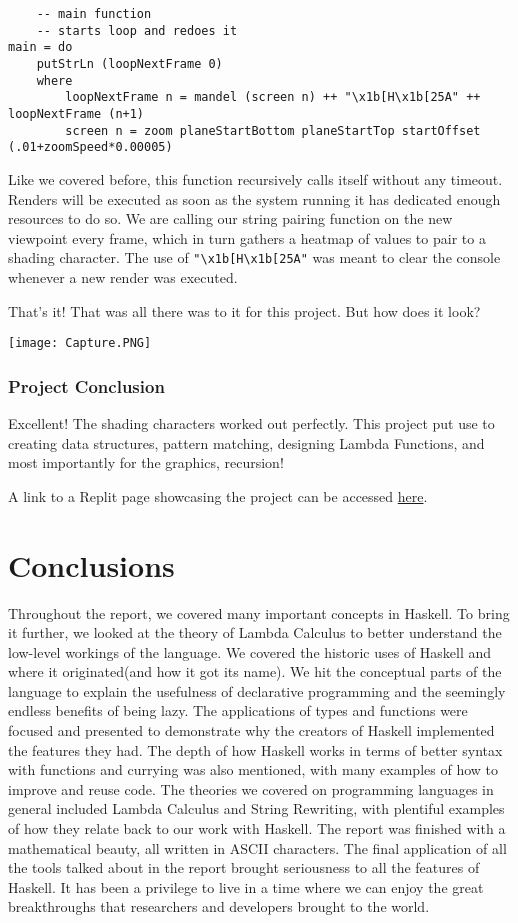 \documentclass{article}
\begin{document}
\begin{lstlisting}
    -- main function
    -- starts loop and redoes it
main = do
    putStrLn (loopNextFrame 0)
    where
        loopNextFrame n = mandel (screen n) ++ "\x1b[H\x1b[25A" ++ loopNextFrame (n+1)
        screen n = zoom planeStartBottom planeStartTop startOffset (.01+zoomSpeed*0.00005) 
\end{lstlisting}

    \medskip\noindent
    Like we covered before, this function recursively calls itself without any timeout. Renders will be executed as soon as the system running it has dedicated enough resources to do so. We are calling our string pairing function on the new viewpoint every frame, which in turn gathers a heatmap of values to pair to a shading character. The use of \lstinline{"\x1b[H\x1b[25A"} was meant to clear the console whenever a new render was executed.
    
    \medskip\noindent
    That's it! That was all there was to it for this project. But how does it look?
    
    \texttt{[image: Capture.PNG]}
    
    \subsubsection{Project Conclusion}
    Excellent! The shading characters worked out perfectly. This project put use to creating data structures, pattern matching, designing Lambda Functions, and most importantly for the graphics, recursion!
    
    \medskip
    A link to a Replit page showcasing the project can be accessed \href{https://replit.com/join/covrdgsrdw-coldsteamyshowr}{here}.
    

\section{Conclusions}\label{conclusions}
Throughout the report, we covered many important concepts in Haskell. To bring it further, we looked at the theory of Lambda Calculus to better understand the low-level workings of the language. We covered the historic uses of Haskell and where it originated(and how it got its name). We hit the conceptual parts of the language to explain the usefulness of declarative programming and the seemingly endless benefits of being lazy. The applications of types and functions were focused and presented to demonstrate why the creators of Haskell implemented the features they had. The depth of how Haskell works in terms of better syntax with functions and currying was also mentioned, with many examples of how to improve and reuse code. The theories we covered on programming languages in general included Lambda Calculus and String Rewriting, with plentiful examples of how they relate back to our work with Haskell. The report was finished with a mathematical beauty, all written in ASCII characters. The final application of all the tools talked about in the report brought seriousness to all the features of Haskell. It has been a privilege to live in a time where we can enjoy the great breakthroughs that researchers and developers brought to the world.
\end{document}
